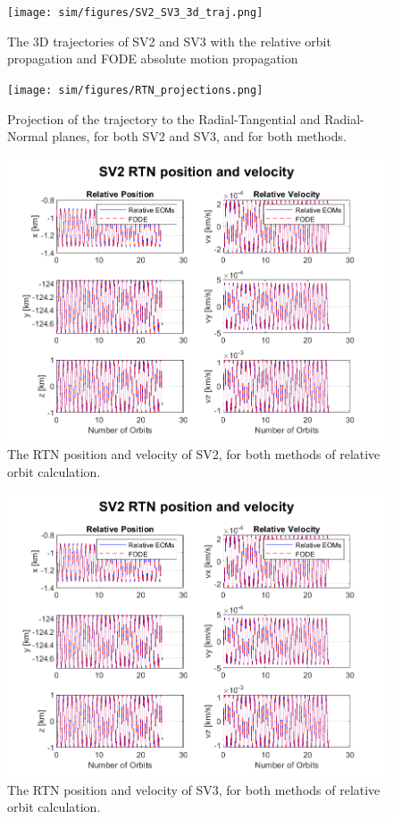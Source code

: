 \begin{figure}[H]
    \centering
    \texttt{[image: sim/figures/SV2\_SV3\_3d\_traj.png]}
    \caption{The 3D trajectories of SV2 and SV3 with the relative orbit propagation and FODE absolute motion propagation}
    \label{fig:rel_3d_traj}
\end{figure}

\begin{figure}[H]
    \centering
    \texttt{[image: sim/figures/RTN\_projections.png]}
    \caption{Projection of the trajectory to the Radial-Tangential and Radial-Normal planes, for both SV2 and SV3, and for both methods.}
    \label{fig:rel_3d_proj}
\end{figure}

\begin{figure}[H]
    \centering
    \includegraphics[width=0.7\linewidth]{sim/figures/SV2_rel_pos_vel.png}
    \caption{The RTN position and velocity of SV2, for both methods of relative orbit calculation.}
    \label{fig:rel_pos_vel_rtn_sv2}
\end{figure}

\begin{figure}[H]
    \centering
    \includegraphics[width=0.7\linewidth]{sim/figures/SV2_rel_pos_vel.png}
    \caption{The RTN position and velocity of SV3, for both methods of relative orbit calculation.}
    \label{fig:rel_pos_vel_rtn_sv3}
\end{figure}


